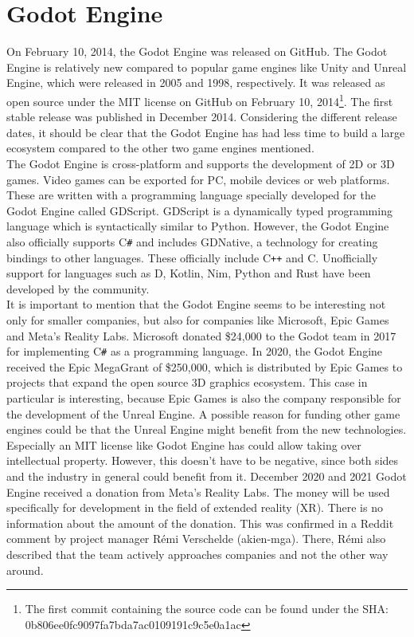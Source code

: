 \section{Godot Engine}
On February 10, 2014, the Godot Engine was released on GitHub.
The Godot Engine is relatively new compared to popular game engines like Unity and Unreal Engine, which were released in 2005 and 1998, respectively\cite{unity-release}\cite{unreal-release}.
It was released as open source under the MIT license on GitHub on February 10, 2014\footnote{The first commit containing the source code can be found under the SHA:\\ 0b806ee0fc9097fa7bda7ac0109191c9c5e0a1ac}\cite{godot-repository}.
The first stable release was published in December 2014\cite{godot-release}.
Considering the different release dates, it should be clear that the Godot Engine has had less time to build a large ecosystem compared to the other two game engines mentioned.\\

The Godot Engine is cross-platform and supports the development of 2D or 3D games\cite{godot-engine}.
Video games can be exported for PC, mobile devices or web platforms.
These are written with a programming language specially developed for the Godot Engine called GDScript.
GDScript is a dynamically typed programming language which is syntactically similar to Python.
However, the Godot Engine also officially supports C\texttt{\#} and includes GDNative, a technology for creating bindings to other languages\cite{godot-gdnative}.
These officially include C\texttt{++} and C.
Unofficially support for languages such as D, Kotlin, Nim, Python and Rust have been developed by the community.\\

It is important to mention that the Godot Engine seems to be interesting not only for smaller companies, but also for companies like Microsoft, Epic Games and Meta's Reality Labs.
Microsoft donated \$24,000 to the Godot team in 2017 for implementing C\texttt{\#} as a programming language\cite{godot-csharp}.
In 2020, the Godot Engine received the Epic MegaGrant of \$250,000, which is distributed by Epic Games to projects that expand the open source 3D graphics ecosystem\cite{godot-megagrant}.
This case in particular is interesting, because Epic \linebreak Games is also the company responsible for the development of the Unreal Engine.
A possible reason for funding other game engines could be that the Unreal Engine might benefit from the new technologies.
Especially an MIT license like Godot Engine has could allow taking over intellectual property.
However, this doesn't have to be negative, since both sides and the industry in general could benefit from it.
December 2020 and 2021 Godot Engine received a donation from Meta's Reality Labs\cite{godot-facebook-reality}\cite{godot-meta-reality}.
The money will be used specifically for development in the field of extended reality (XR).
There is no information about the amount of the donation.
This was confirmed in a Reddit comment by project manager Rémi Verschelde (akien-mga)\cite{reddit-companies-akien}.
There, Rémi also described that the team actively approaches companies and not the other way around.
